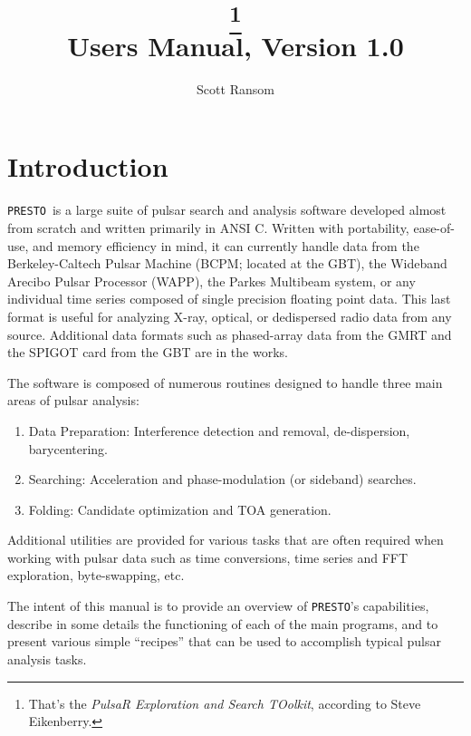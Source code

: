\documentclass[11pt]{article}
\title{\huge \PRESTO\thanks{That's the \emph{PulsaR Exploration and Search TOolkit}, according to Steve Eikenberry.}\\
  {\large Users Manual, Version 1.0}}
\author{Scott Ransom}
\newcommand{\PRESTO}{{\tt PRESTO}}
\begin{document}
\maketitle

\section{Introduction}

\PRESTO\ is a large suite of pulsar search and analysis software
developed almost from scratch and written primarily in ANSI C.
Written with portability, ease-of-use, and memory efficiency in mind,
it can currently handle data from the Berkeley-Caltech Pulsar Machine
(BCPM; located at the GBT), the Wideband Arecibo Pulsar
Processor (WAPP), the Parkes Multibeam system, or any individual time
series composed of single precision floating point data.  This last
format is useful for analyzing X-ray, optical, or dedispersed radio
data from any source.  Additional data formats such as phased-array
data from the GMRT and the SPIGOT card from the GBT are in the works.

The software is composed of numerous routines designed to handle three
main areas of pulsar analysis:
\begin{enumerate}
\item Data Preparation:  Interference detection and removal, de-dispersion, barycentering.
\item Searching:  Acceleration and phase-modulation (or sideband) searches.
\item Folding:  Candidate optimization and TOA generation.
\end{enumerate}
Additional utilities are provided for various tasks that are often
required when working with pulsar data such as time conversions, time
series and FFT exploration, byte-swapping, etc.

The intent of this manual is to provide an overview of \PRESTO's
capabilities, describe in some details the functioning of each of the
main programs, and to present various simple ``recipes'' that can be
used to accomplish typical pulsar analysis tasks.
\end{document}
